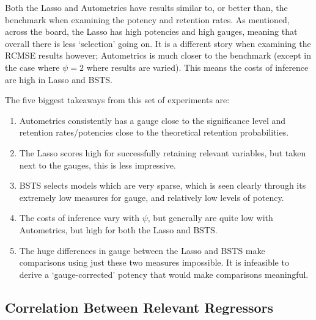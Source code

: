 Both the Lasso and Autometrics have results similar to, or better than, the benchmark when examining the potency and retention rates. As mentioned, across the board, the Lasso has high potencies and high gauges, meaning that overall there is less `selection' going on. It is a different story when examining the RCMSE results however; Autometrics is much closer to the benchmark (except in the case where $\psi=2$ where results are varied). This means the costs of inference are high in Lasso and BSTS.

The five biggest takeaways from this set of experiments are:
\begin{enumerate}
\item Autometrics consistently has a gauge close to the significance level and retention rates/potencies close to the theoretical retention probabilities.
\item The Lasso scores high for successfully retaining relevant variables, but taken next to the gauges, this is less impressive.
\item BSTS selects models which are very sparse, which is seen clearly through its extremely low measures for gauge, and relatively low levels of potency.
\item The costs of inference vary with $\psi$, but generally are quite low with Autometrics, but high for both the Lasso and BSTS.
\item The huge differences in gauge between the Lasso and BSTS make comparisons using just these two measures impossible. It is infeasible to derive a `gauge-corrected' potency that would make comparisons meaningful.
\end{enumerate}



\subsection{Correlation Between Relevant Regressors}

